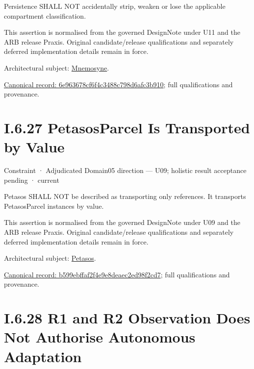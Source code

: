 Persistence SHALL NOT accidentally strip, weaken or lose the applicable compartment classification.



This assertion is normalised from the governed DesignNote under U11 and the ARB release Praxis. Original candidate/release qualifications and separately deferred implementation details remain in force.



Architectural subject: \hyperref[element:7985e647bf9e4ca3ba70faf9e3e4ae02]{Mnemosyne}.


{\footnotesize \href{../../../../continuum/motivation/constraint/6e963678cf6f4c3488c798d6afc3b910.md}{Canonical record: 6e963678cf6f4c3488c798d6afc3b910}; full qualifications and provenance.}\par
\section*{I.6.27 PetasosParcel Is Transported by Value}
\label{navigation:I.6.27}

\label{element:b599ebffaf2f4e9e8deaec2ed98f2cd7}
{\small Constraint · Adjudicated Domain05 direction — U09; holistic result acceptance pending · current}\par

Petasos SHALL NOT be described as transporting only references. It transports PetasosParcel instances by value.



This assertion is normalised from the governed DesignNote under U09 and the ARB release Praxis. Original candidate/release qualifications and separately deferred implementation details remain in force.



Architectural subject: \hyperref[element:195e5f10db8e419391354197b5d7a8cc]{Petasos}.


{\footnotesize \href{../../../../continuum/motivation/constraint/b599ebffaf2f4e9e8deaec2ed98f2cd7.md}{Canonical record: b599ebffaf2f4e9e8deaec2ed98f2cd7}; full qualifications and provenance.}\par
\section*{I.6.28 R1 and R2 Observation Does Not Authorise Autonomous Adaptation}
\label{navigation:I.6.28}

